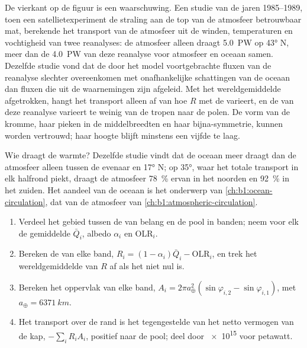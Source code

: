 De vierkant op de figuur is een waarschuwing. Een studie van de jaren 1985--1989, toen een satellietexperiment de straling aan de top van de atmosfeer betrouwbaar mat, berekende het transport van de atmosfeer uit de winden, temperaturen en vochtigheid van twee reanalyses: de atmosfeer alleen draagt \qty{5.0}{PW} op \ang{43} N, meer dan de \qty{4.0}{PW} van deze reanalyse voor atmosfeer en oceaan samen. Dezelfde studie vond dat de door het model voortgebrachte fluxen van de reanalyse slechter overeenkomen met onafhankelijke schattingen van de oceaan dan fluxen die uit de waarnemingen zijn afgeleid. Met het wereldgemiddelde afgetrokken, hangt het transport alleen af van hoe $R$ met de  varieert, en de  van deze reanalyse varieert te weinig van de tropen naar de polen. De vorm van de kromme, haar pieken in de middelbreedten en haar bijna-symmetrie, kunnen worden vertrouwd; haar hoogte blijft minstens een vijfde te laag.

Wie draagt de warmte? Dezelfde studie vindt dat de oceaan meer draagt dan de atmosfeer alleen tussen de evenaar en \ang{17} N; op \ang{35}, waar het totale transport in elk halfrond piekt, draagt de atmosfeer \qty{78}{\percent} ervan in het noorden en \qty{92}{\percent} in het zuiden. Het aandeel van de oceaan is het onderwerp van \cref{ch:b1:ocean-circulation}, dat van de atmosfeer van \cref{ch:b1:atmospheric-circulation}.

\begin{method}\label{met:b1:radiation-heat-transport:bands}
\begin{enumerate}
  \item Verdeel het gebied tussen de  van belang en de pool in banden; neem voor elk de gemiddelde  $\bar Q_i$, albedo $\alpha_i$ en OLR$_i$.
  \item Bereken de  van elke band, $R_i = (1 - \alpha_i)\bar Q_i -
        \text{OLR}_i$, en trek het wereldgemiddelde van $R$ af als het niet nul is.
  \item Bereken het oppervlak van elke band, $A_i = 2\pi a_\oplus^2(\sin\varphi_{i,2} -
        \sin\varphi_{i,1})$, met $a_\oplus = \qty{6371}{km}$.
  \item Het transport over de rand is het tegengestelde van het netto vermogen van de kap,
        $-\sum_i R_i A_i$, positief naar de pool; deel door \num{e15} voor
        petawatt.
\end{enumerate}
\end{method}

